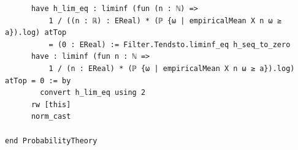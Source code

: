 \newpage
\begin{lstlisting}
      have h_lim_eq : liminf (fun (n : ℕ) =>
          1 / ((n : ℝ) : EReal) * (ℙ {ω | empiricalMean X n ω ≥ a}).log) atTop
          = (0 : EReal) := Filter.Tendsto.liminf_eq h_seq_to_zero
      have : liminf (fun n : ℕ =>
          1 / (n : EReal) * (ℙ {ω | empiricalMean X n ω ≥ a}).log) atTop = 0 := by
        convert h_lim_eq using 2
      rw [this]
      norm_cast

end ProbabilityTheory
\end{lstlisting}
